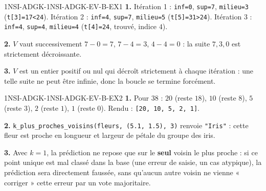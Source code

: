 \begin{corrige}{1NSI-ADGK-1NSI-ADGK-EV-B-EX1}
\textbf{1.} Itération 1 : \lstinline{inf=0}, \lstinline{sup=7}, \lstinline{milieu=3}
(\lstinline{t[3]=17<24}). Itération 2 : \lstinline{inf=4}, \lstinline{sup=7},
\lstinline{milieu=5} (\lstinline{t[5]=31>24}). Itération 3 : \lstinline{inf=4},
\lstinline{sup=4}, \lstinline{milieu=4} (\lstinline{t[4]=24}, trouvé, indice $4$).

\textbf{2.} $V$ vaut successivement $7-0=7$, $7-4=3$, $4-4=0$ : la suite $7,3,0$ est
strictement décroissante.

\textbf{3.} $V$ est un entier positif ou nul qui décroît strictement à chaque itération :
une telle suite ne peut être infinie, donc la boucle se termine forcément.
\end{corrige}

\begin{corrige}{1NSI-ADGK-1NSI-ADGK-EV-B-EX2}
\textbf{1.} Pour $38$ : $20$ (reste $18$), $10$ (reste $8$), $5$ (reste $3$), $2$ (reste
$1$), $1$ (reste $0$). Rendu : \lstinline{[20, 10, 5, 2, 1]}.

\textbf{2.} \lstinline{k_plus_proches_voisins(fleurs, (5.1, 1.5), 3)} renvoie
\lstinline{"Iris"} : cette fleur est proche en longueur et largeur de pétale du groupe des
iris.

\textbf{3.} Avec $k=1$, la prédiction ne repose que sur le \textbf{seul} voisin le plus
proche : si ce point unique est mal classé dans la base (une erreur de saisie, un cas
atypique), la prédiction sera directement faussée, sans qu'aucun autre voisin ne vienne
« corriger » cette erreur par un vote majoritaire.
\end{corrige}
